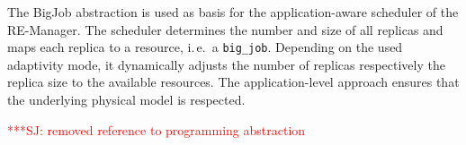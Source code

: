 \documentclass{rspublic}
\newcommand{\alnote}[1]{ {\textcolor{blue} { ***AL: #1 }}}
\newcommand{\jhanote}[1]{ {\textcolor{red} { ***SJ: #1 }}}
\newcommand{\alnote}[1]{}
\newcommand{\jhanote}[1]{}
\newcommand{\glidein}[1]{Glide-In }
\newcommand{\remanager}[1]{RE-Manager }
\begin{document}
The BigJob abstraction is used as basis for the application-aware scheduler
of the RE-Manager. The scheduler determines the number and size of all replicas and
maps each replica to a resource, i.\,e.\ a \texttt{big\_job}. Depending on the used adaptivity mode,
it dynamically adjusts the number of replicas respectively the replica 
size to the available resources. The application-level approach ensures 
that the underlying physical model is respected.




                                         





\jhanote{removed reference to programming abstraction}
\end{document}
